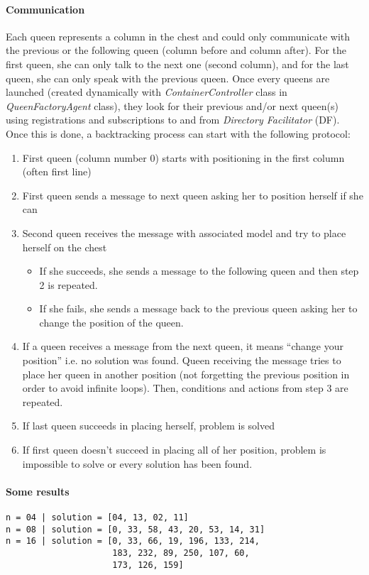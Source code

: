 \documentclass[a4paper,11pt]{article}
\begin{document}
  \paragraph{Communication}  
  Each queen represents a column in the chest and could only communicate with the previous or the following queen (column before and column after). 
  For the first queen, she can only talk to the next one (second column), and for the last queen, she can only speak with the previous queen. Once every 
  queens are launched (created dynamically with \textit{ContainerController} class in \textit{QueenFactoryAgent} class), they look for their previous 
  and/or next queen(s) using registrations and subscriptions to and from \textit{Directory Facilitator} (DF). Once this is done, a backtracking process 
  can start with the following protocol:
  \begin{enumerate}
   \item First queen (column number 0) starts with positioning in the first column (often first line)
   \item First queen sends a message to next queen asking her to position herself if she can
   \item Second queen receives the message with associated model and try to place herself on the chest
   \begin{itemize}
    \item If she succeeds, she sends a message to the following queen and then step 2 is repeated.
    \item If she fails, she sends a message back to the previous queen asking her to change the position of the queen.
   \end{itemize}
   \item If a queen receives a message from the next queen, it means ``change your position'' i.e. no solution was found.
   Queen receiving the message tries to place her queen in another position (not forgetting the previous position in order 
   to avoid infinite loops). Then, conditions and actions from step 3 are repeated.
   \item If last queen succeeds in placing herself, problem is solved
   \item If first queen doesn't succeed in placing all of her position, problem is impossible to solve or every solution has 
   been found.
  \end{enumerate}
  
  \paragraph{Some results}
\begin{verbatim}
n = 04 | solution = [04, 13, 02, 11]
n = 08 | solution = [0, 33, 58, 43, 20, 53, 14, 31]
n = 16 | solution = [0, 33, 66, 19, 196, 133, 214,
                     183, 232, 89, 250, 107, 60, 
                     173, 126, 159]
\end{verbatim}
\end{document}
